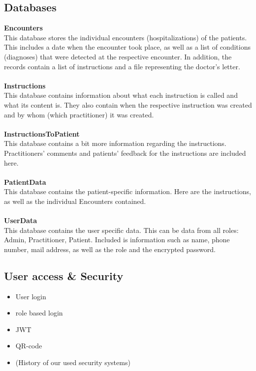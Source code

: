 \documentclass[]{report}
\begin{document}
\subsection{Databases}
\textbf{Encounters}\\
This database stores the individual encounters (hospitalizations) of the patients. This includes a date when the encounter took place, as well as a list of conditions (diagnoses) that were detected at the respective encounter. In addition, the records contain a list of instructions and a file representing the doctor's letter.\\\\
\textbf{Instructions}\\
This database contains information about what each instruction is called and what its content is. They also contain when the respective instruction was created and by whom (which practitioner) it was created.\\\\
\textbf{InstructionsToPatient}\\
This database contains a bit more information regarding the instructions. Practitioners' comments and patients' feedback for the instructions are included here.\\\\
\textbf{PatientData}\\
This database contains the patient-specific information. Here are the instructions, as well as the individual Encounters contained.\\\\
\textbf{UserData}\\
This database contains the user specific data. This can be data from all roles: Admin, Practitioner, Patient. Included is information such as name, phone number, mail address, as well as the role and the encrypted password.

\subsection{User access \& Security}
\begin{itemize}
    \item User login
    \item role based login
    \item JWT
    \item QR-code
    \item (History of our used security systems)
\end{itemize}
\end{document}
